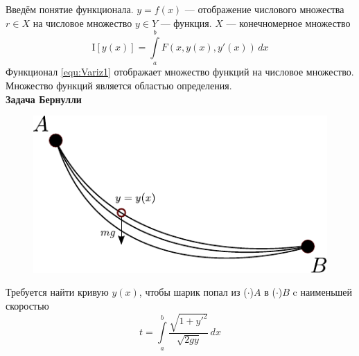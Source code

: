 Введём понятие функционала. $y = f(x)$ --- отображение числового множества $r \in X$ на числовое множество $y \in Y$ --- функция. $X$ --- конечномерное множество
\begin{equation}
	\mathrm{I} [y(x)] = \int\limits_a^b F(x, y(x), y'(x))\,dx
	\label{equ:Variz1}
\end{equation}
Функционал \eqref{equ:Variz1} отображает множество функций на числовое множество. Множество функций является областью определения.\\

\textbf{Задача Бернулли}\\
\begin{figure}[h!]
	\centering
	\includegraphics{figVariaz.pdf}
\end{figure}

Требуется найти кривую $y(x)$, чтобы шарик попал из ($\cdot$)$A$ в ($\cdot$)$B$ c наименьшей скоростью
\[
	t = \int\limits_a^b  \frac{\sqrt{1 + y'^2}}{\sqrt{2 g y}}\, dx
\]


